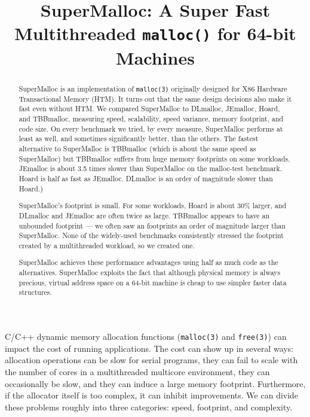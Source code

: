 \documentclass[pldi]{sigplanconf-pldi15}
\newcommand{\code}[1]{\texttt{#1}}
\begin{document}
\title{SuperMalloc: A Super Fast Multithreaded \texttt{malloc()} for 64-bit Machines}
\date{}
\maketitle
\begin{abstract}
SuperMalloc is an implementation of \texttt{malloc(3)} originally
designed for X86 Hardware Transactional Memory (HTM)\@.  It turns out
that the same design decisions also make it fast even without HTM\@.
We compared SuperMalloc to DLmalloc, JEmalloc, Hoard, and TBBmalloc,
measuring speed, scalability, speed variance, memory footprint, and
code size.  On every benchmark we tried, by every measure, SuperMalloc
performs at least as well, and sometimes significantly better, than the
others.  The fastest alternative to SuperMalloc is TBBmalloc (which is
about the same speed as SuperMalloc) but TBBmalloc suffers from huge
memory footprints on some workloads.  JEmalloc is about 3.5 times
slower than SuperMalloc on the malloc-test benchmark.  Hoard is half
as fast as JEmalloc. DLmalloc is an order of magnitude slower than
Hoard.)

SuperMalloc's footprint is small.  For some workloads, Hoard is about
30\% larger, and DLmalloc and JEmalloc are often twice as large.
TBBmalloc appears to have an unbounded footprint --- we often saw an
footprints an order of magnitude larger than SuperMalloc.  None of the
widely-used benchmarks consistently stressed the footprint created by
a multithreaded workload, so we created one.

SuperMalloc achieves these performance advantages using half as much
code as the alternatives.  SuperMalloc exploits the fact that although
physical memory is always precious, virtual address space on a 64-bit
machine is cheap to use simpler faster data structures.
\end{abstract}


C/C++ dynamic memory allocation functions (\code{malloc(3)} and
\code{free(3)}) can impact the cost of running applications.  The cost
can show up in several ways: allocation operations can be slow for
serial programs, they can fail to scale with the number of cores in a
multithreaded multicore environment, they can occasionally be slow,
and they can induce a large memory footprint.  Furthermore, if the
allocator itself is too complex, it can inhibit improvements.  We can
divide these problems roughly into three categories: speed, footprint,
and complexity. 
\end{document}
